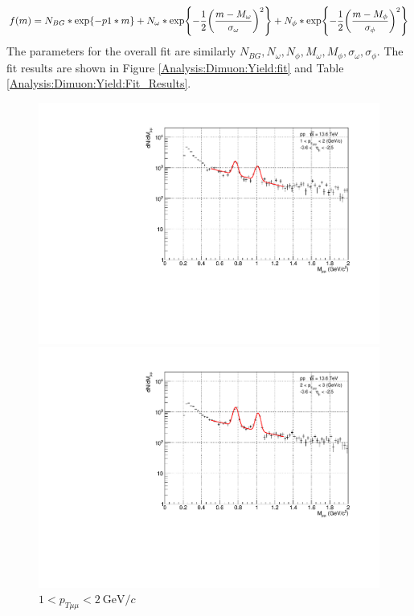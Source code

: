                 \begin{eqnarray}
                    \label{fit:globalfit}
                    f(m)=N_{BG}*\exp{-p1* m}+N_{\omega}*\exp{-\frac{1}{2}\qty(\frac{m-M_{\omega}}{\sigma_{\omega}})^2}+N_{\phi}*\exp{-\frac{1}{2}\qty(\frac{m-M_{\phi}}{\sigma_{\phi}})^2}
                \end{eqnarray}
                The parameters for the overall fit are similarly \(N_{BG}, N_{\omega}, N_{\phi}, M_{\omega}, M_{\phi}, \sigma_{\omega}, \sigma_{\phi}\). The fit results are shown in Figure \ref{Analysis:Dimuon:Yield:fit} and Table \ref{Analysis:Dimuon:Yield:Fit_Results}.
                \begin{figure}[H]
                    \centering
                    \begin{minipage}{0.45\textwidth}
                        \centering
                        \includegraphics[width=\textwidth]{fig/3_4_2_fit_pt_1to2.pdf}
                        \captionsetup{labelformat=empty}
                        \caption*{$1 < p_{T\mu\mu} < 2\ \mathrm{GeV}/c$}
                    \end{minipage}
                    \hfill
                    \begin{minipage}{0.45\textwidth}
                        \centering
                        \includegraphics[width=\textwidth]{fig/3_4_2_fit_pt_2to3.pdf}

\end{minipage}
\end{figure}
